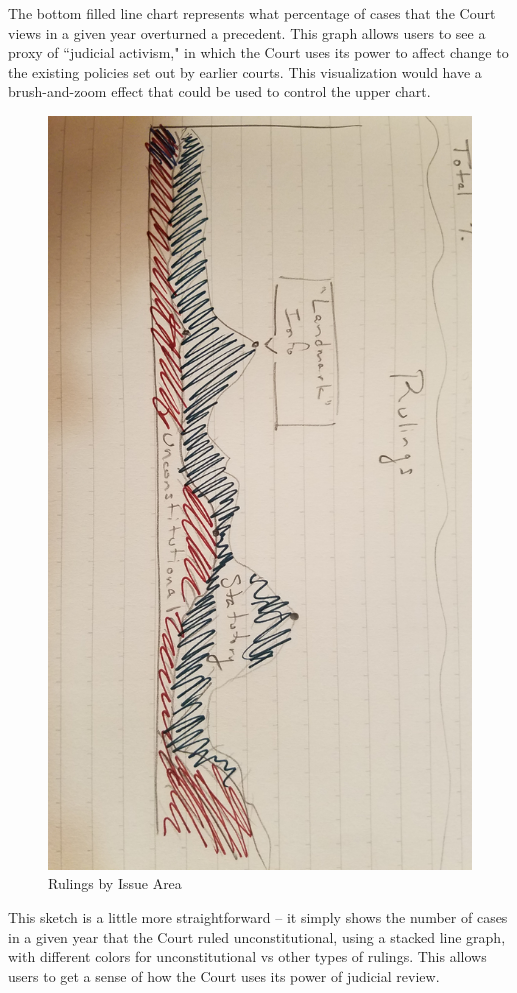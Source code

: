 \documentclass{article}
\begin{document}
The bottom filled line chart represents what percentage of cases that the Court views in a given year overturned a precedent.  This graph allows users to see a proxy of ``judicial activism," in which the Court uses its power to affect change to the existing policies set out by earlier courts.  This visualization would have a brush-and-zoom effect that could be used to control the upper chart.

\begin{figure}[h!]
    \includegraphics[width=\linewidth]{pics/Rulings.jpg}
    \caption{Rulings by Issue Area}
    \label{fig:roughrulings}
\end{figure}
\FloatBarrier
This sketch is a little more straightforward -- it simply shows the number of cases in a given year that the Court ruled unconstitutional, using a stacked line graph, with different colors for unconstitutional vs other types of rulings.  This allows users to get a sense of how the Court uses its power of judicial review.
\end{document}
